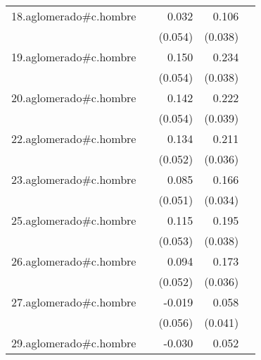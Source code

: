 {\begin{longtable}{l*{4}{D{.}{.}{-1}}}
\addlinespace
18.aglomerado#c.hombre&                     &       0.032         &       0.106\sym{**} &                     \\
            &                     &     (0.054)         &     (0.038)         &                     \\
\addlinespace
19.aglomerado#c.hombre&                     &       0.150\sym{**} &       0.234\sym{***}&                     \\
            &                     &     (0.054)         &     (0.038)         &                     \\
\addlinespace
20.aglomerado#c.hombre&                     &       0.142\sym{**} &       0.222\sym{***}&                     \\
            &                     &     (0.054)         &     (0.039)         &                     \\
\addlinespace
22.aglomerado#c.hombre&                     &       0.134\sym{**} &       0.211\sym{***}&                     \\
            &                     &     (0.052)         &     (0.036)         &                     \\
\addlinespace
23.aglomerado#c.hombre&                     &       0.085         &       0.166\sym{***}&                     \\
            &                     &     (0.051)         &     (0.034)         &                     \\
\addlinespace
25.aglomerado#c.hombre&                     &       0.115\sym{*}  &       0.195\sym{***}&                     \\
            &                     &     (0.053)         &     (0.038)         &                     \\
\addlinespace
26.aglomerado#c.hombre&                     &       0.094         &       0.173\sym{***}&                     \\
            &                     &     (0.052)         &     (0.036)         &                     \\
\addlinespace
27.aglomerado#c.hombre&                     &      -0.019         &       0.058         &                     \\
            &                     &     (0.056)         &     (0.041)         &                     \\
\addlinespace
29.aglomerado#c.hombre&                     &      -0.030         &       0.052         &                     \\

\end{longtable}}
